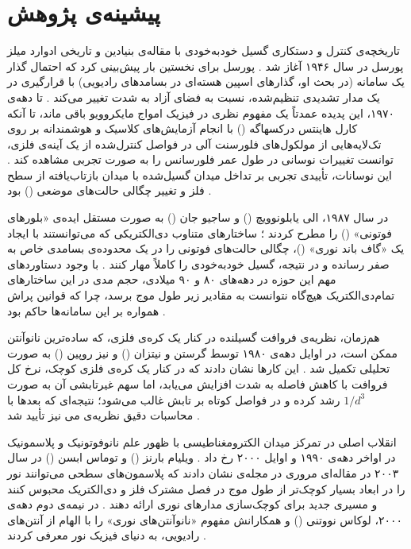 \documentclass[12pt,a4paper]{report}
\begin{document}
\section{پیشینه‌ی پژوهش}
تاریخچه‌ی کنترل و دستکاری گسیل خودبه‌خودی با مقاله‌ی بنیادین و تاریخی ادوارد میلز پورسل در سال ۱۹۴۶ آغاز شد \cite{purcell}. پورسل برای نخستین بار پیش‌بینی کرد که احتمال گذار یک سامانه (در بحث او، گذارهای اسپین هسته‌ای در بسامدهای رادیویی) با قرارگیری در یک مدار تشدیدی تنظیم‌شده، نسبت به فضای آزاد به شدت تغییر می‌کند \cite{purcell}. تا دهه‌ی ۱۹۷۰، این پدیده عمدتاً یک مفهوم نظری در فیزیک امواج مایکروویو باقی ماند، تا آنکه کارل هاینتس درکسهاگه () با انجام آزمایش‌های کلاسیک و هوشمندانه بر روی تک‌لایه‌هایی از مولکول‌های فلورسنت آلی در فواصل کنترل‌شده از یک آینه‌ی فلزی، توانست تغییرات نوسانی در طول عمر فلورسانس را به صورت تجربی مشاهده کند \cite{drexhage,novotny}. این نوسانات، تأییدی تجربی بر تداخل میدان گسیل‌شده با میدان بازتاب‌یافته از سطح فلز و تغییر چگالی حالت‌های موضعی () بود \cite{novotny,drexhage}.

در سال ۱۹۸۷، الی یابلونوویچ () و ساجیو جان () به صورت مستقل ایده‌ی «بلورهای فوتونی» () را مطرح کردند \cite{yablonovitch,john}؛ ساختارهای متناوب دی‌الکتریکی که می‌توانستند با ایجاد یک «گاف باند نوری» ()، چگالی حالت‌های فوتونی را در یک محدوده‌ی بسامدی خاص به صفر رسانده و در نتیجه، گسیل خودبه‌خودی را کاملاً مهار کنند \cite{yablonovitch,john,novotny}. با وجود دستاوردهای مهم این حوزه در دهه‌های ۸۰ و ۹۰ میلادی، حجم مدی در این ساختارهای تمام‌دی‌الکتریک هیچ‌گاه نتوانست به مقادیر زیر طول موج برسد، چرا که قوانین پراش همواره بر این سامانه‌ها حاکم بود \cite{novotny,maier}.

هم‌زمان، نظریه‌ی فروافت گسیلنده در کنار یک کره‌ی فلزی، که ساده‌ترین نانوآنتن ممکن است، در اوایل دهه‌ی ۱۹۸۰ توسط گرستن و نیتزان () و نیز روپین () به صورت تحلیلی تکمیل شد \cite{gersten,ruppin}. این کارها نشان دادند که در کنار یک کره‌ی فلزی کوچک، نرخ کل فروافت با کاهش فاصله به شدت افزایش می‌یابد، اما سهم غیرتابشی آن به صورت $1/d^3$ رشد کرده و در فواصل کوتاه بر تابش غالب می‌شود؛ نتیجه‌ای که بعدها با محاسبات دقیق نظریه‌ی می نیز تأیید شد \cite{mertens}.

انقلاب اصلی در تمرکز میدان الکترومغناطیسی با ظهور علم نانوفوتونیک و پلاسمونیک در اواخر دهه‌ی ۱۹۹۰ و اوایل ۲۰۰۰ رخ داد \cite{maier,novotny}. ویلیام بارنز () و توماس ابسن () در سال ۲۰۰۳ در مقاله‌ای مروری در مجله‌ی  نشان دادند که پلاسمون‌های سطحی می‌توانند نور را در ابعاد بسیار کوچک‌تر از طول موج در فصل مشترک فلز و دی‌الکتریک محبوس کنند و مسیری جدید برای کوچک‌سازی مدارهای نوری ارائه دهند \cite{barnes,maier}. در نیمه‌ی دوم دهه‌ی ۲۰۰۰، لوکاس نووتنی () و همکارانش مفهوم «نانوآنتن‌های نوری» را با الهام از آنتن‌های رادیویی، به دنیای فیزیک نور معرفی کردند \cite{novotny,bharadwaj}.
\end{document}
